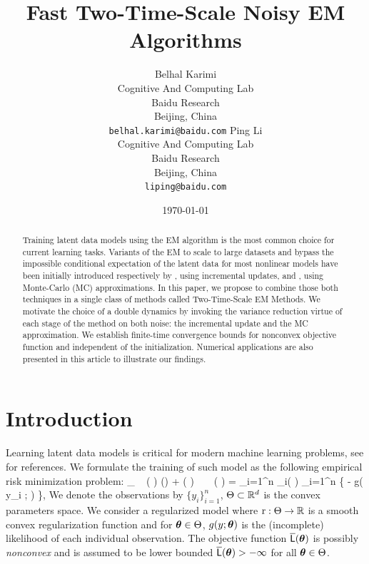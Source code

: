 \documentclass[11pt]{article}
\theoremstyle{t}
\begin{document}
\title{Fast Two-Time-Scale Noisy EM Algorithms}
\author{
  Belhal Karimi \\
  Cognitive And Computing Lab\\
  Baidu Research\\
  Beijing, China \\
  \texttt{belhal.karimi@baidu.com} 
   \And
  Ping Li \\
  Cognitive And Computing Lab\\
  Baidu Research\\
  Beijing, China \\
  \texttt{liping@baidu.com} }
\date{\today}

\maketitle

\begin{abstract}
Training latent data models using the EM algorithm is the most common choice for current learning tasks. 
Variants of the EM to scale to large datasets and bypass the impossible conditional expectation of the latent data for most nonlinear models have been initially introduced respectively by \citep{neal1998view}, using incremental updates, and \citep{wei1990monte, delyon1999}, using Monte-Carlo (MC) approximations.
In this paper, we propose to combine those both techniques in a single class of methods called Two-Time-Scale EM Methods. 
We motivate the choice of a double dynamics by invoking the variance reduction virtue of each stage of the method on both noise: the incremental update and the MC approximation.
We establish finite-time convergence bounds for nonconvex objective function and independent of the initialization.
Numerical applications are also presented in this article to illustrate our findings.
\end{abstract}


\section{Introduction}
Learning latent data models is critical for modern machine learning problems, see \citep{mclachlan2007algorithm} for references.
We formulate the training of such model as the following empirical risk minimization problem:
\beq \label{eq:em_motivate}
\min_{ \param \in \Param }~ \overline{\calL} ( \param ) \eqdef \Pen (\param) + \calL ( \param )~~~~\calL ( \param ) =  \sum_{i=1}^n \calL_i( \param) \eqdef  {} \sum_{i=1}^n \big\{ - \log g( y_i ; \param ) \big\}\eqs,
\eeq
We denote the observations by $\{y_i\}_{i=1}^n$, $\Param \subset \rset^d$ is the convex parameters space.
We consider a regularized model where $\Pen : \Param \rightarrow \rset$ is a smooth convex regularization function and for $\param \in \Param$, $g(y;\param)$ is the (incomplete) likelihood of each individual  observation.
The objective function $ \overline{\calL} ( \param )$ is possibly \emph{nonconvex} and is assumed to be lower bounded $ \overline{\calL} ( \param ) > - \infty$ for all $\param \in \Param$.
\end{document}
